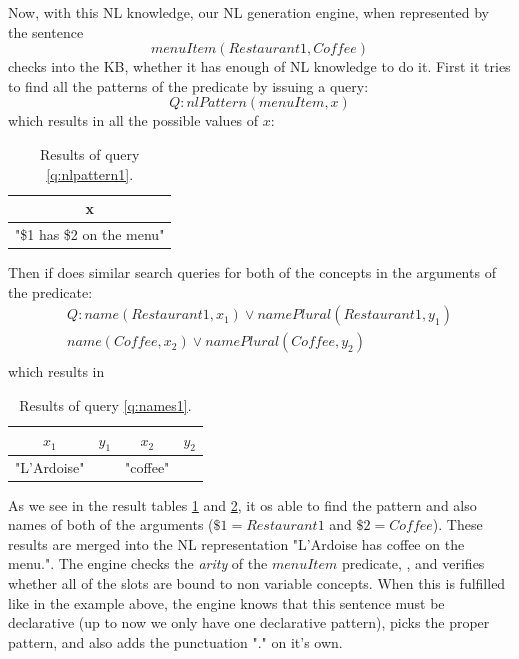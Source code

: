 Now, with this NL knowledge, our NL generation engine, when represented by
the sentence 
\begin{equation}
\label{nl:menuItem1}
menuItem(Restaurant1,Coffee)
\end{equation}
checks into the KB, whether it 
has enough of NL knowledge to do it. First it tries to find all the patterns
of the predicate by issuing a query:
\begin{equation}\label{q:nlpattern1}
Q:nlPattern(menuItem,x)
\end{equation}
which results in all the possible values of $x$:
\begin{table}[H]
\centering
\caption{Results of query \ref{q:nlpattern1}.}
\label{tab:results1}
\begin{tabular}{|c|}
	\hline
	\textbf{x} \\
    \hline
    "\$1 has \$2 on the menu" \\
    \hline
\end{tabular}
\end{table}
Then if does similar search queries for both of the concepts in the arguments
of the predicate:
\begin{equation}\label{q:names1}
\begin{gathered}
Q:name(Restaurant1,x_1) \lor namePlural(Restaurant1,y_1)\\
name(Coffee,x_2) \lor namePlural(Coffee,y_2)\\
\end{gathered}
\end{equation}
which results in
\begin{table}[H]
\centering
\caption{Results of query \ref{q:names1}.}
\label{tab:results2}
\begin{tabular}{|c|c|c|c|}
	\hline
	\textbf{$x_1$} & \textbf{$y_1$} & \textbf{$x_2$} & \textbf{$y_2$}\\
    \hline
    "L'Ardoise" & & "coffee" & \\
    \hline
\end{tabular}
\end{table}
As we see in the result tables \ref{tab:results1} and \ref{tab:results2}, it
os able to find the pattern and also names of both of the arguments 
($\$1=Restaurant1$ and $\$2=Coffee$). These results are merged into the 
NL representation "L'Ardoise has coffee on the menu.". 
The engine checks the \emph{arity} of the $menuItem$ predicate, ,
and verifies whether all of the slots are bound to non variable concepts. When
this is fulfilled like in the example above, the engine knows that this 
sentence must be declarative (up to now we only have one declarative pattern), 
picks the proper pattern, and also adds the punctuation "." on it's own.

